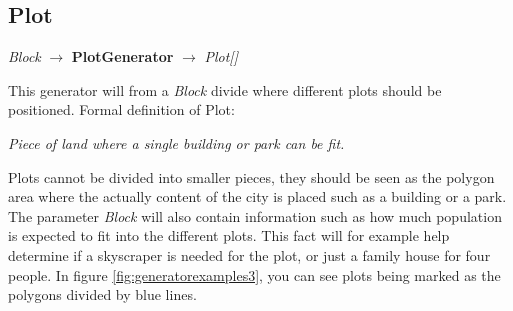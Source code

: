\subsection{Plot}
\begin{center}
    \textit{Block} $\rightarrow$ \textbf{PlotGenerator} $\rightarrow$ \textit{Plot{[}{]}}
\end{center}
This generator will from a \textit{Block} divide where different plots should be positioned. 
Formal definition of Plot:
\begin{center}
    \textit{Piece of land where a single building or park can be fit.}
\end{center}
Plots cannot be divided into smaller pieces, they should be seen as the polygon area where the actually content of the city is placed such as a building or a park.
The parameter \textit{Block} will also contain information such as how much population is expected to fit into the different plots. 
This fact will for example help determine if a skyscraper is needed for the plot, or just a family house for four people. In figure \ref{fig:generatorexamples3}, you can see plots being marked as the polygons divided by blue lines. 
